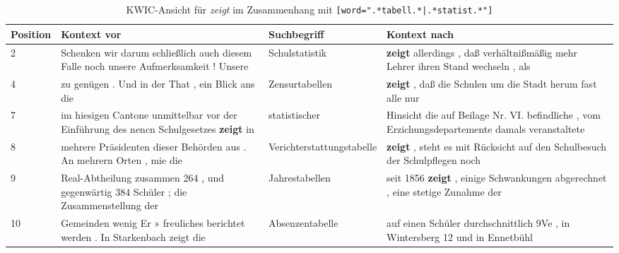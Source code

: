     \renewcommand{\arraystretch}{1.2}{
    \begin{table}[!ht]
        \footnotesize
        \centering
        \begin{tabular}{p{0.1cm}p{5cm}p{1cm}p{5cm}} \toprule
            \textbf{Position} & \textbf{Kontext vor} & \textbf{Suchbegriff} & \textbf{Kontext nach} \\ \midrule 
            2 & Schenken wir darum schließlich auch diesem Falle noch unsere Aufmerksamkeit ! Unsere  & Schulstatistik & \textbf{zeigt} allerdings , daß verhältnißmäßig mehr Lehrer ihren Stand wechseln , als  \\ 
            4 & zu genügen . Und in der That , ein Blick ans die & Zensurtabellen & \textbf{zeigt} , daß die Schulen um die Stadt herum fast alle nur   \\ 
            7 & im hiesigen Cantone unmittelbar vor der Einführung des nencn Schulgesetzes \textbf{zeigt} in & statistischer & Hinsicht die auf Beilage Nr. VI. befindliche , vom Erzichungsdepartemente damals veranstaltete \\ 
            8 & mehrere Präsidenten dieser Behörden aus . An mehrern Orten , mie die  & Vericht\-erstattungs\-tabelle & \textbf{zeigt} , steht es mit Rücksicht auf den Schulbesuch der Schulpflegen noch   \\ 
            9 & Real-Abtheilung zusammen 264 , und gegenwärtig 384 Schüler ; die Zusammenstellung der & Jahrestabellen & 	
            seit 1856 \textbf{zeigt} , einige Schwankungen abgerechnet , eine stetige Zunahme der   \\ 
            10 & Gemeinden wenig Er » freuliches berichtet werden . In Starkenbach zeigt die & Absenzen\-tabelle & auf einen Schüler durchschnittlich 9Ve , in Wintersberg 12 und in Ennetbühl   \\ 
            \bottomrule
        \end{tabular}
        \caption{KWIC-Ansicht für \textit{zeigt} im Zusammenhang mit \texttt{[word=".*ta\-bell.*|\-.*sta\-tist.*"]}}
        \label{table:5-2}
    \end{table}
}